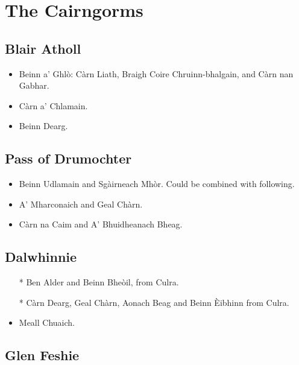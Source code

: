 \section{The Cairngorms}

\subsection{Blair Atholl}

\begin{itemize}
\item Beinn a' Ghlò: Càrn Liath, Braigh Coire Chruinn-bhalgain, and Càrn nan
  Gabhar.

\item Càrn a' Chlamain.

\item Beinn Dearg.
\end{itemize}


\subsection{Pass of Drumochter}

\begin{itemize}
\item
Beinn Udlamain and Sgàirneach Mhòr.  Could be combined with following.

\item
A' Mharconaich and Geal Chàrn.

\item Càrn na Caim and A' Bhuidheanach Bheag.
\end{itemize}


\subsection{Dalwhinnie}

\begin{itemize}
\item[*]
Ben Alder and Beinn Bheòil, from Culra.

\item[*]
Càrn Dearg, Geal Chàrn, Aonach Beag and Beinn Èibhinn  from Culra.

\item
Meall Chuaich.
\end{itemize}


\subsection{Glen Feshie}

